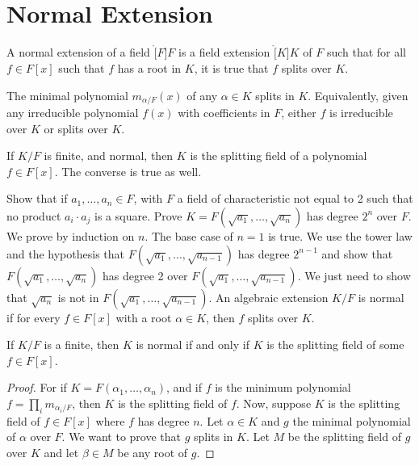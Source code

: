 \section{Normal Extension}
    \begin{definition}
        A normal extension of a field $\ring[F]{F}$ is a field extension
        $\ring[K]{K}$ of $F$ such that for all $f\in{F}[x]$ such that $f$
        has a root in $K$, it is true that $f$ splits over $K$.
    \end{definition}
    \begin{theorem}
        The minimal polynomial $m_{\alpha/F}(x)$ of any $\alpha\in{K}$
        splits in $K$. Equivalently, given any irreducible polynomial
        $f(x)$ with coefficients in $F$, either $f$ is irreducible over $K$
        or splits over $K$.
    \end{theorem}
    \begin{theorem}
        If $K/F$ is finite, and normal, then $K$ is the splitting field of
        a polynomial $f\in{F}[x]$. The converse is true as well.
    \end{theorem}
    Show that if $a_{1},\dots,a_{n}\in{F}$, with $F$ a field of
    characteristic not equal to 2 such that no product $a_{i}\cdot{a}_{j}$
    is a square. Prove $K=F(\sqrt{a_{1}},\dots,\sqrt{a_{n}})$ has degree
    $2^{n}$ over $F$. We prove by induction on $n$. The base case of $n=1$
    is true. We use the tower law and the hypothesis that
    $F(\sqrt{a_{1}},\dots,\sqrt{a_{n-1}})$ has degree $2^{n-1}$ and show
    that $F(\sqrt{a_{1}},\dots,\sqrt{a_{n}})$ has degree 2 over
    $F(\sqrt{a_{1}},\dots,\sqrt{a_{n-1}})$. We just need to show that
    $\sqrt{a_{n}}$ is not in $F(\sqrt{a_{1}},\dots,\sqrt{a_{n-1}})$.
    An algebraic extension $K/F$ is normal if for every $f\in{F}[x]$ with a
    root $\alpha\in{K}$, then $f$ splits over $K$.
    \begin{theorem}
        If $K/F$ is a finite, then $K$ is normal if and only if $K$ is the
        splitting field of some $f\in{F}[x]$.
    \end{theorem}
    \begin{proof}
        For if $K=F(\alpha_{1},\dots,\alpha_{n})$, and if $f$ is the
        minimum polynomial $f=\prod_{i}m_{\alpha_{i}/F}$, then $K$ is the
        splitting field of $f$. Now, suppose $K$ is the splitting field of
        $f\in{F}[x]$ where $f$ has degree $n$. Let $\alpha\in{K}$ and $g$
        the minimal polynomial of $\alpha$ over $F$. We want to prove that
        $g$ splits in $K$. Let $M$ be the splitting field of $g$ over $K$
        and let $\beta\in{M}$ be any root of $g$.
    \end{proof}
